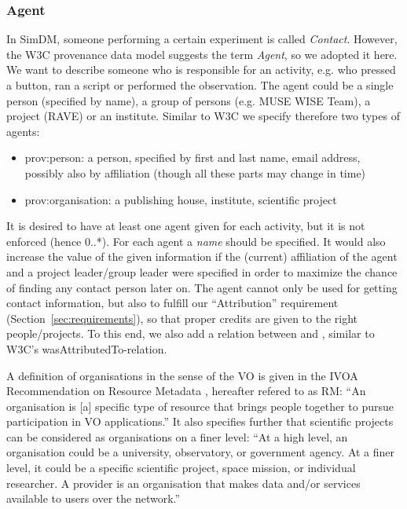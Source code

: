


\subsubsection{Agent}\label{sec:w3c-agent}
In SimDM, someone performing a certain experiment is called \emph{Contact}. However, 
the W3C provenance data model suggests the term \emph{Agent}, so we adopted it here.
We want to describe someone who is responsible for an activity, e.g. who pressed a button, 
ran a script or performed the observation. The agent could be a single person 
(specified by name), a group of persons (e.g. MUSE WISE Team), a 
project (RAVE) or an institute. Similar to W3C we specify therefore two types
of agents: 

\begin{itemize}
\item prov:person: a person, specified by first and last name, email address, 
possibly also by affiliation (though all these parts may change in time)
\item prov:organisation: a publishing house, institute, scientific project
\end{itemize}

It is desired to have at least one agent given for each activity, but it
is not enforced (hence 0..*).  
For each agent a \emph{name} should be specified.
It would also increase the value of the given
information if the (current) affiliation of the agent and a project leader/group
leader were specified in order to maximize the chance of finding any contact 
person later on. The agent cannot only be used for getting contact 
information, but also to fulfill our ``Attribution'' requirement 
(Section~\ref{sec:requirements}), so that proper credits are given to the right 
people/projects. To this end, we also add a 
relation between  and , similar to W3C's 
wasAttributedTo-relation.

A definition of organisations in the sense of the VO is given in the 
IVOA Recommendation on Resource Metadata \citep{std:ResourceMeta}, hereafter 
refered to as RM: ``An organisation is [a] specific type of resource that 
brings people together to pursue participation in VO applications.''
It also specifies further that scientific projects can be considered 
as organisations on a finer level:
``At a high level, an organisation could be a university, observatory, or government
agency. At a finer level, it could be a specific scientific project, space mission,
or individual researcher. A provider is an organisation that makes data and/or services
available to users over the network.''

